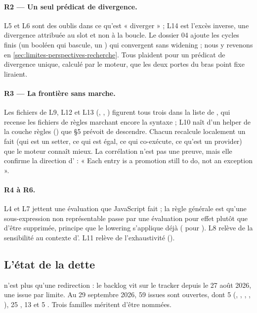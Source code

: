 \paragraph{R2 --- Un seul prédicat de divergence.} L5 et L6 sont des oublis dans ce qu'est « diverger » ; L14 est l'excès inverse, une divergence attribuée au slot et non à la boucle. Le dossier 04 ajoute les cycles finis (un booléen qui bascule, un ) qui convergent sans widening ; nous y revenons en \cref{sec:limites-perspectives-recherche}. Tous plaident pour un prédicat de divergence unique, calculé par le moteur, que les deux portes du bras point fixe liraient.

\paragraph{R3 --- La frontière sans marche.} Les fichiers de L9, L12 et L13 (, , ) figurent tous trois dans la liste  de , qui recense les fichiers de règles marchant encore la syntaxe ; L10 naît d'un helper de la couche règles () que  §5 prévoit de descendre. Chacun recalcule localement un fait (qui est un setter, ce qui est égal, ce qui co-exécute, ce qu'est un provider) que le moteur connaît mieux. La corrélation n'est pas une preuve, mais elle confirme la direction d' : « Each entry is a promotion still to do, not an exception ».

\paragraph{R4 à R6.} L4 et L7 jettent une évaluation que JavaScript fait ; la règle générale est qu'une sous-expression non représentable passe par une évaluation pour effet plutôt que d'être supprimée, principe que le lowering s'applique déjà ( pour ). L8 relève de la sensibilité au contexte d'. L11 relève de l'exhaustivité ().

\subsection{L'état de la dette}

 n'est plus qu'une redirection : le backlog vit sur le tracker depuis le 27 août 2026, une issue par limite. Au 29 septembre 2026, 59 issues sont ouvertes, dont 5  (, , , , ), 25 , 13  et 5 . Trois familles méritent d'être nommées.

